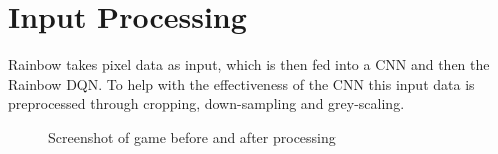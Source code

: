 \section{Input Processing}
Rainbow takes pixel data as input, which is then fed into a CNN and then the Rainbow DQN. To help with the effectiveness of the CNN this input data is preprocessed through cropping, down-sampling and grey-scaling. 
\begin{figure}[ht]
    \centering
    \hfill
    \caption{Screenshot of game before and after processing}
\end{figure}